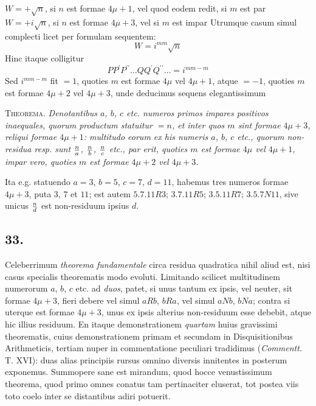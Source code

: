 \documentclass[twoside,12pt, showframe]{memoir}
\renewenvironment{quote}%
  {\list{}{\leftmargin=5em\rightmargin=0em}\item[]}%
  {\endlist}
\let\oldfrac\frac
\def\frac#1#2{\mathchoice{\tfrac{#1}{#2}}{\oldfrac{#1}{#2}}{\genfrac{}{}{}{2}{#1}{#2\mathstrut}}{\genfrac{}{}{}{3}{#1}{#2\mathstrut}}}
\begin{document}
\begin{quote}\(W=+\surd n\), si \(n\) est formae \(4 \mu+1\), vel quod eodem redit, si \(m\) est par\\
\(W=+i \sqrt n\), si \(n\) est formae \(4 \mu+3\), vel si \(m\) est impar\end{quote}
Utrumque casum simul complecti licet per formulam sequentem:
\[W=i^{m m} \surd n\]
Hinc itaque colligitur
\[P P^{\prime} P^{\prime \prime} \ldots Q Q^{\prime} Q^{\prime \prime} \ldots=i^{m m-m}\]
Sed \(i^{m m-m}\) fit \(=1\), quoties \(m\) est formae \(4 \mu\) vel \(4 \mu+1\), atque \(=-1\), quoties \(m\) est formae \(4 \mu+2\) vel \(4 \mu+3\), unde deducimus sequens elegantissimum

\textsc{Theorema.} \textit{Denotantibus \(a\), \(b\), \(c\) etc. numeros primos impares positivos inaequales, quorum productum statuitur \(=n\), et inter quos \(m\) sint formae \(4 \mu+3\), reliqui formae \(4 \mu+1\): multitudo eorum ex his numeris \(a\), \(b\), \(c\) etc., quorum non-residua resp. sunt \(\frac{n}{a}\), \(\frac{n}{b}\), \(\frac{n}{c}\) etc., par erit, quoties \(m\) est formae \(4 \mu\) vel \(4 \mu+1\), impar vero, quoties \(m\) est formae \(4 \mu+2\) vel \(4 \mu+3\).}
 
Ita e.g. statuendo \(a=3\), \(b=5\), \(c=7\), \(d=11\), habemus tres numeros formae \(4 \mu+3\), puta \(3\), \(7\) et \(11\); est autem \(5.7.11R3\); \(3.7.11R5\); \(3.5.11R7\); \(3.5.7N11\), sive unicus \(\frac{n}{d}\) est non-residuum ipsius \(d\).

\subsection*{33.}
 
Celeberrimum \textit{theorema fundamentale} circa residua quadratica nihil aliud est, nisi casus specialis theorematis modo evoluti. Limitando scilicet multitudinem\clearpage\noindent%
numerorum \(a\), \(b\), \(c\)  etc. ad \textit{duos}, patet, si unus tantum ex ipsis, vel neuter, sit formae \(4 \mu+3\), fieri debere vel simul \(a R b\), \(b R a\), vel simul \(a N b\), \(b N a\); contra si uterque est formae \(4 \mu+3\), unus ex ipsis alterius non-residuum esse debebit, atque hic illius residuum. En itaque demonstrationem \textit{quartam} huius gravissimi theorematis, cuius demonstrationem primam et secundam in Disquisitionibus Arithmeticis, tertiam nuper in commentatione peculiari tradidimus (\textit{Commentt.} T. XVI): duas alias principiis rursus omnino diversis innitentes in posterum exponemus. Summopere sane est mirandum, quod hocce venustissimum theorema, quod primo omnes conatus tam pertinaciter eluserat, tot postea viis toto coelo inter se distantibus adiri potuerit.
\end{document}
